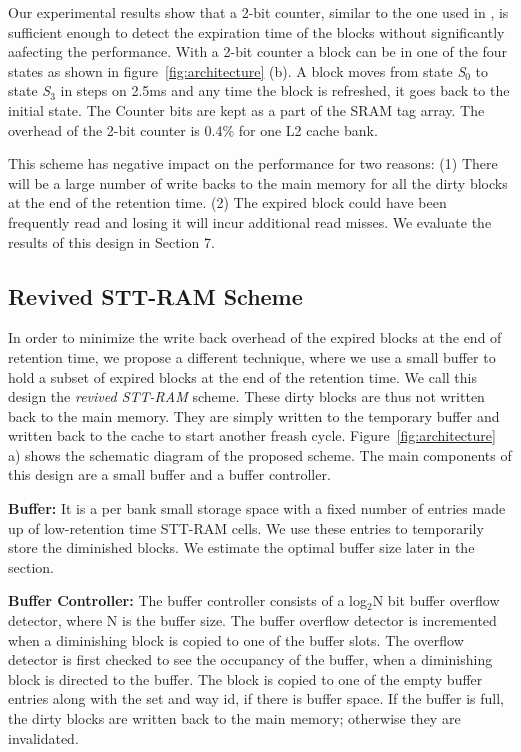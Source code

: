 Our experimental results show that a 2-bit counter, similar to the one used in \cite{marget},
is sufficient enough to detect the expiration time of the blocks without significantly aafecting the performance.
With a 2-bit counter a block can be in one of the four states as shown in figure~\ref{fig:architecture} (b).
A block moves from state {\it S$_0$} to state {\it S$_3$} in steps on 2.5ms and any time the block is refreshed, it 
goes back to the initial state.  The Counter bits are kept as a part of the SRAM tag array. 
The overhead of the 2-bit counter is 0.4\% for one L2 cache bank.  

This scheme has negative impact on the performance for two reasons: (1) There will be  a large number of write
backs to the main memory for all the dirty blocks at the end of the retention time. 
(2) The expired block could have been frequently read and losing it will incur additional read misses.
We evaluate the results of this design in Section 7.


\subsection{{Revived STT-RAM Scheme}}
In order to minimize the write back overhead of the expired blocks at the end of retention time, we propose 
a different technique, where we use a small buffer to hold a subset of expired blocks at the end of the retention
time. We call this design the {\it revived STT-RAM} scheme. These dirty blocks are thus not written back to the main memory. They are simply written to the temporary buffer and
written back to the cache to start another freash cycle. 
Figure~\ref{fig:architecture} a) shows the schematic diagram of the proposed scheme.
The main components of this design are a small buffer and a buffer controller.

\noindent\textbf{Buffer:}
It is a per bank small storage space with a fixed number of entries made up of low-retention time STT-RAM cells.
We use these entries to temporarily store the diminished blocks. We estimate the optimal buffer size later in 
the section.

\noindent\textbf{Buffer Controller:}
The buffer controller consists of a log$_2$N bit buffer overflow detector, where N is the buffer size.
The buffer overflow detector is incremented when a diminishing block
is copied to one of the buffer slots. The overflow detector is first checked to see the occupancy of the buffer,
when a diminishing block is directed to the buffer. 
The block is copied to one of the empty buffer entries along with the set and way id, if there is 
buffer space. 
If the buffer is full, the dirty blocks are written back to the main memory; otherwise they are  invalidated. 

